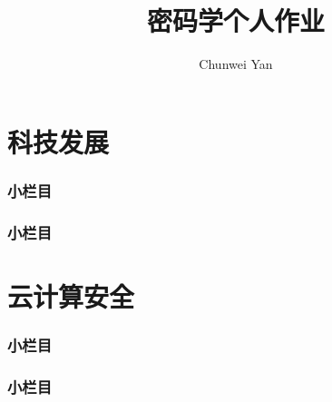 \documentclass[a4paper]{ctexart}
\author{Chunwei Yan}
\title{密码学个人作业}
\begin{document}
    \maketitle
    \part{科技发展}
    \section{小栏目}
    \section{小栏目}

    \part{云计算安全}
    \section{小栏目}
    \section{小栏目}
\end{document}
